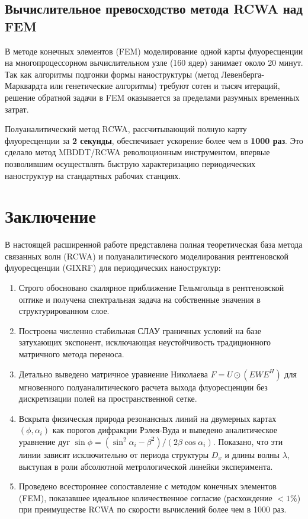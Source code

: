 \documentclass[a4paper,11pt]{article}
\begin{document}
\subsection{Вычислительное превосходство метода RCWA над FEM}

В методе конечных элементов (FEM) моделирование одной карты флуоресценции на многопроцессорном вычислительном узле (160 ядер) занимает около 20 минут. Так как алгоритмы подгонки формы наноструктуры (метод Левенберга-Марквардта или генетические алгоритмы) требуют сотен и тысяч итераций, решение обратной задачи в FEM оказывается за пределами разумных временных затрат.

Полуаналитический метод RCWA, рассчитывающий полную карту флуоресценции за \textbf{2 секунды}, обеспечивает ускорение более чем в \textbf{1000 раз}. Это сделало метод MBDDT/RCWA революционным инструментом, впервые позволившим осуществлять быструю характеризацию периодических наноструктур на стандартных рабочих станциях.

\newpage
\section*{Заключение}

В настоящей расширенной работе представлена полная теоретическая база метода связанных волн (RCWA) и полуаналитического моделирования рентгеновской флуоресценции (GIXRF) для периодических наноструктур:
\begin{enumerate}
    \item Строго обосновано скалярное приближение Гельмгольца в рентгеновской оптике и получена спектральная задача на собственные значения в структурированном слое.
    \item Построена численно стабильная СЛАУ граничных условий на базе затухающих экспонент, исключающая неустойчивость традиционного матричного метода переноса.
    \item Детально выведено матричное уравнение Николаева $F = U \odot (E W E^H)$ для мгновенного полуаналитического расчета выхода флуоресценции без дискретизации полей на пространственной сетке.
    \item Вскрыта физическая природа резонансных линий на двумерных картах $(\phi, \alpha_i)$ как порогов дифракции Рэлея-Вуда и выведено аналитическое уравнение дуг $\sin\phi = (\sin^2\alpha_i - \beta^2) / (2\beta\cos\alpha_i)$. Показано, что эти линии зависят исключительно от периода структуры $D_x$ и длины волны $\lambda$, выступая в роли абсолютной метрологической линейки эксперимента.
    \item Проведено всестороннее сопоставление с методом конечных элементов (FEM), показавшее идеальное количественное согласие (расхождение $< 1\%$) при преимуществе RCWA по скорости вычислений более чем в 1000 раз.
\end{enumerate}
\end{document}
